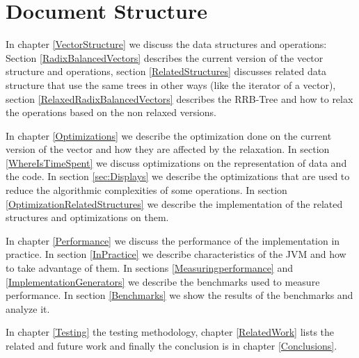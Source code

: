 \section{Document Structure}
In chapter \ref{VectorStructure} we discuss the data structures and operations: Section \ref{RadixBalancedVectors} describes the current version of the vector structure and operations, section \ref{RelatedStructures} discusses related data structure that use the same trees in other ways (like the iterator of a vector), section \ref{RelaxedRadixBalancedVectors} describes the RRB-Tree and how to relax the operations based on the non relaxed versions.

In chapter \ref{Optimizations} we describe the optimization done on the current version of the vector and how they are affected by the relaxation. In section \ref{WhereIsTimeSpent} we discuss optimizations on the representation of data and the code. In section \ref{sec:Displays} we describe the optimizations that are used to reduce the algorithmic complexities of some operations. In section \ref{OptimizationRelatedStructures} we describe the implementation of the related structures and optimizations on them.

In chapter \ref{Performance} we discuss the performance of the implementation in practice. In section \ref{InPractice} we describe characteristics of the JVM and how to take advantage of them. In sections \ref{Measuringperformance} and \ref{ImplementationGenerators} we describe the benchmarks used to measure performance. In section \ref{Benchmarks} we show  the results of the benchmarks and analyze it.

In chapter \ref{Testing} the testing methodology, chapter \ref{RelatedWork} lists the related and future work and finally the conclusion is in chapter \ref{Conclusions}.




